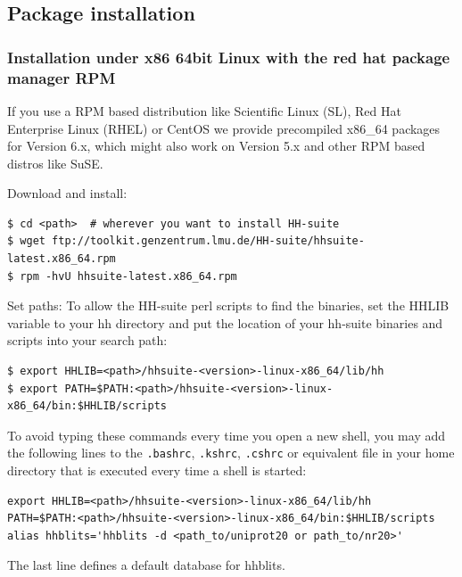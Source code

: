 \documentclass[11pt,a4paper]{article}
\begin{document}
\subsection{Package installation}

\subsubsection*{Installation under x86 64bit Linux with the red hat package manager RPM}

If you use a RPM based distribution like Scientific Linux (SL), Red Hat Enterprise Linux (RHEL) or CentOS we provide precompiled x86\_64 packages for
Version 6.x, which might also work on Version 5.x and other RPM based distros
like SuSE.

\begin{enum}
\item Download and install:\\[-6mm]
\begin{verbatim}
$ cd <path>  # wherever you want to install HH-suite
$ wget ftp://toolkit.genzentrum.lmu.de/HH-suite/hhsuite-latest.x86_64.rpm
$ rpm -hvU hhsuite-latest.x86_64.rpm
\end{verbatim}
\vspace{2mm}

\item Set paths: To allow the HH-suite perl scripts to find the binaries, set the HHLIB variable to your hh directory 
and put the location of your hh-suite binaries and scripts into your search path:\\[-6mm]
\begin{verbatim}
$ export HHLIB=<path>/hhsuite-<version>-linux-x86_64/lib/hh 
$ export PATH=$PATH:<path>/hhsuite-<version>-linux-x86_64/bin:$HHLIB/scripts
\end{verbatim}

To avoid typing these commands every time you open a new shell, you may add the following lines to the \verb`.bashrc`, \verb`.kshrc`, \verb`.cshrc` or equivalent file in your home directory that is executed every time a shell is started:
\begin{verbatim}
export HHLIB=<path>/hhsuite-<version>-linux-x86_64/lib/hh
PATH=$PATH:<path>/hhsuite-<version>-linux-x86_64/bin:$HHLIB/scripts
alias hhblits='hhblits -d <path_to/uniprot20 or path_to/nr20>'
\end{verbatim}
The last line defines a default database for hhblits. 

\end{enum}
\end{document}
